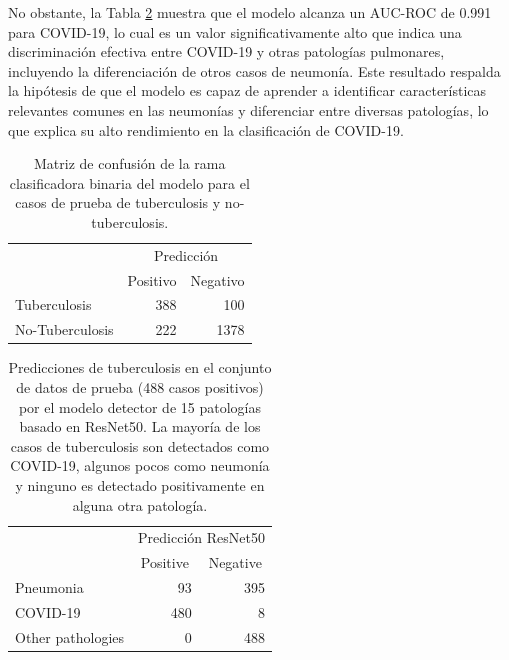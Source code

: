 No obstante, la Tabla \ref{table_tb1_15} muestra que el modelo alcanza un AUC-ROC de 0.991 para COVID-19, lo cual es un
valor significativamente alto que indica una discriminación efectiva entre COVID-19 y otras patologías pulmonares,
incluyendo la diferenciación de otros casos de neumonía. Este resultado respalda la hipótesis de que el modelo es capaz
de aprender a identificar características relevantes comunes en las neumonías y diferenciar entre diversas patologías,
lo que explica su alto rendimiento en la clasificación de COVID-19.


\begin{table}[!ht]
    \centering
    \begin{tabular}{lcr}
                                          & \multicolumn{2}{c}{Predicción}                                \\ \cline{2-3}
    \multicolumn{1}{l|}{}                 & \multicolumn{1}{c|}{Positivo} & \multicolumn{1}{c|}{Negativo} \\ \hline
    \multicolumn{1}{|l|}{Tuberculosis}    & \multicolumn{1}{r|}{388}      & \multicolumn{1}{r|}{100}      \\ \hline
    \multicolumn{1}{|l|}{No-Tuberculosis} & \multicolumn{1}{r|}{222}      & \multicolumn{1}{r|}{1378}     \\ \hline
    \end{tabular}
    \caption{Matriz de confusión de la rama clasificadora binaria del modelo para el casos de prueba
             de tuberculosis y no-tuberculosis.}
    \label{table_tb1}
\end{table}


\begin{table}[!ht]
    \centering
    \begin{tabular}{lcr}
                                   & \multicolumn{2}{c}{Predicción ResNet50}                                \\ \cline{2-3}
    \multicolumn{1}{l|}{}          & \multicolumn{1}{c|}{Positive} & \multicolumn{1}{c|}{Negative} \\ \hline
    \multicolumn{1}{|l|}{Pneumonia}& \multicolumn{1}{r|}{93}      & \multicolumn{1}{r|}{395}      \\ \hline
    \multicolumn{1}{|l|}{COVID-19}  & \multicolumn{1}{r|}{480}        & \multicolumn{1}{r|}{8}     \\ \hline
    \multicolumn{1}{|l|}{Other pathologies}  & \multicolumn{1}{r|}{0}        & \multicolumn{1}{r|}{488}     \\ \hline
    \end{tabular}
    \caption{Predicciones de tuberculosis en el conjunto de datos de prueba (488 casos positivos) por el modelo
             detector de 15 patologías basado en ResNet50. La mayoría de los casos de tuberculosis son
             detectados como COVID-19, algunos pocos como neumonía y ninguno es detectado positivamente
             en alguna otra patología.}
    \label{table_tb1_15}
\end{table}

